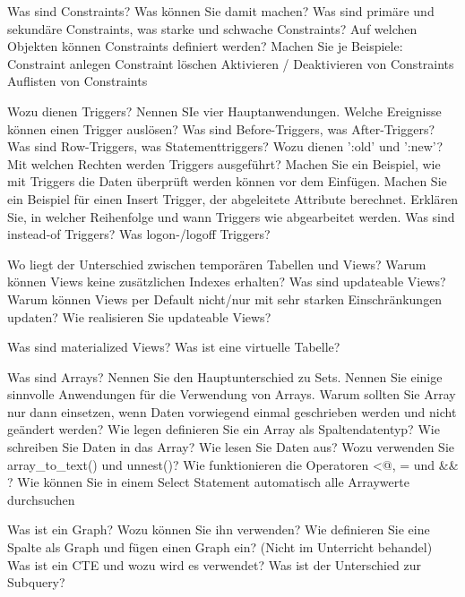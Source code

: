 \documentclass[ngerman,a4paper,12pt]{scrreprt}
\begin{document}
\olR
	\li Was sind Constraints? Was können Sie damit machen?
	\li Was sind primäre und sekundäre Constraints, was starke und schwache Constraints?
	\li Auf welchen Objekten können Constraints definiert werden?
	\li Machen Sie je Beispiele:
		\ol
			\li Constraint anlegen
			\li Constraint löschen
			\li Aktivieren / Deaktivieren von Constraints
			\li Auflisten von Constraints
		\olE
\olS


\olR
	\li Wozu dienen Triggers? Nennen SIe vier Hauptanwendungen.
	\li Welche Ereignisse können einen Trigger auslösen?
	\li Was sind Before-Triggers, was After-Triggers? Was sind Row-Triggers, was Statementtriggers?
	\li Wozu dienen ':old' und ':new'?
	\li Mit welchen Rechten werden Triggers ausgeführt?
	\li Machen Sie ein Beispiel, wie mit Triggers die Daten überprüft werden können vor dem Einfügen.
	\li Machen Sie ein Beispiel für einen Insert Trigger, der abgeleitete Attribute berechnet.
	\li Erklären Sie, in welcher Reihenfolge und wann Triggers wie abgearbeitet werden.
	\li Was sind instead-of Triggers? Was logon-/logoff Triggers?
\olS

\olR
	\li Wo liegt der Unterschied zwischen temporären Tabellen und Views?
	\li Warum können Views keine zusätzlichen Indexes erhalten?
	\li Was sind updateable Views? Warum können Views per Default nicht/nur mit sehr starken Einschränkungen updaten?
	\li Wie realisieren Sie updateable Views?
\olS

\olR
	\li Was sind materialized Views?
	\li Was ist eine virtuelle Tabelle?
\olS


\olR
	\li Was sind Arrays?
	\li Nennen Sie den Hauptunterschied zu Sets.
	\li Nennen Sie einige sinnvolle Anwendungen für die Verwendung von Arrays.
	\li Warum sollten Sie Array nur dann einsetzen, wenn Daten vorwiegend einmal geschrieben werden und nicht geändert werden?
	\li Wie legen definieren Sie ein Array als Spaltendatentyp? Wie schreiben Sie Daten in das Array? Wie lesen Sie Daten aus?
	\li Wozu verwenden Sie array\_to\_text() und unnest()?
	\li Wie funktionieren die Operatoren <@, = und \&\& ?
	\li Wie können Sie in einem Select Statement automatisch alle Arraywerte durchsuchen
\olS

\olR
	\li Was ist ein Graph? Wozu können Sie ihn verwenden?
	\li Wie definieren Sie eine Spalte als Graph und fügen einen Graph ein? (Nicht im Unterricht behandel)
	\li Was ist ein CTE und wozu wird es verwendet? Was ist der Unterschied zur Subquery?
\olS
\end{document}
